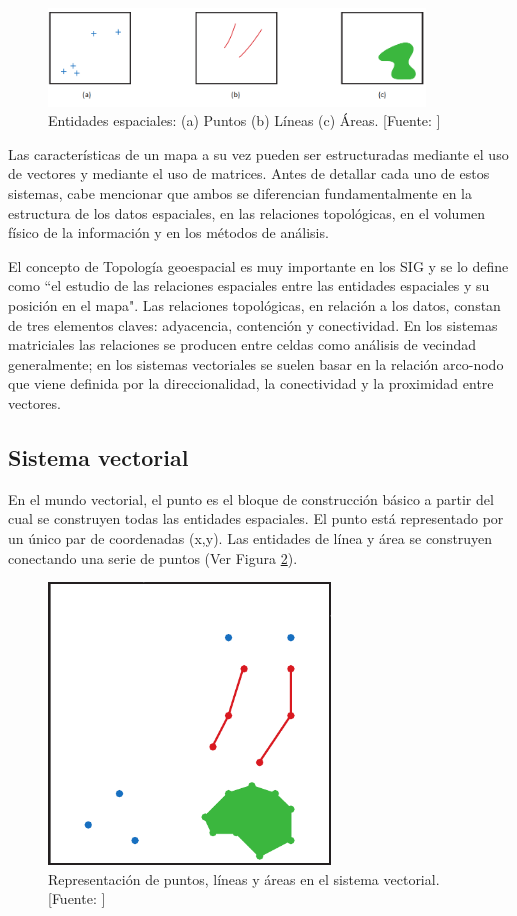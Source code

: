 \begin{figure}[H]
    \centering
    \includegraphics[width=10cm]{entidadesGeometricas.png}
    \caption{Entidades espaciales: (a) Puntos (b) Líneas (c) Áreas. [Fuente: \citet{Heywood2006AnSystems}]}
    \label{fig:entidadesPuntoLineaPoligono}
\end{figure}

Las características de un mapa a su vez pueden ser estructuradas mediante el uso de vectores y mediante el uso de matrices. Antes de detallar cada uno de estos sistemas, cabe mencionar que ambos se diferencian fundamentalmente en la estructura de los datos espaciales, en las relaciones topológicas, en el volumen físico de la información y en los métodos de análisis.

El concepto de Topología geoespacial es muy importante en los SIG y se lo define como ``el estudio de las relaciones espaciales entre las entidades espaciales y su posición en el mapa". Las relaciones topológicas, en relación a los datos, constan de tres elementos claves: adyacencia, contención y conectividad. En los sistemas matriciales las relaciones se producen entre celdas como análisis de vecindad generalmente; en los sistemas vectoriales se suelen basar en la relación arco-nodo que viene definida por la direccionalidad, la conectividad y la proximidad entre vectores.

\subsection{Sistema vectorial}

En el mundo vectorial, el punto es el bloque de construcción básico a partir del cual se construyen todas las entidades espaciales. El punto está representado por un único par de coordenadas (x,y). Las entidades de línea y área se construyen conectando una serie de puntos (Ver Figura \ref{fig:modeloVectorial}).

\begin{figure}[H]
    \centering
    \includegraphics[width=7.5cm]{modeloVectorial.png}
    \caption{Representación de puntos, líneas y áreas en el sistema vectorial. [Fuente: \citet{Heywood2006AnSystems}]}
    \label{fig:modeloVectorial}
\end{figure}

